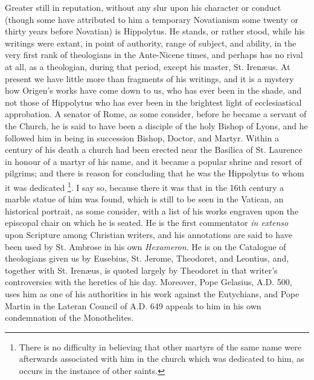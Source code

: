 Greater still in reputation, without any slur upon his character or
conduct (though some have attributed to him a temporary Novatianism
some twenty or thirty years before Novatian) is Hippolytus. He stands,
or rather stood, while his writings were extant, in point of authority, range of subject, and ability, in the very first rank of
theologians in the Ante-Nicene times, and perhaps has no rival at all,
as a theologian, during that period, except his master, St. Irenæus.
At present we have little more than fragments of his writings, and it
is a mystery how Origen's works have come down to us, who has ever
been in the shade, and not those of Hippolytus who has ever been in
the brightest light of ecclesiastical approbation. A senator of Rome,
as some consider, before he became a servant of the Church, he is said
to have been a disciple of the holy Bishop of Lyons, and he followed
him in being in succession Bishop, Doctor, and Martyr. Within a
century of his death a church had been erected near the Basilica of
St. Laurence in honour of a martyr of his name, and it became a
popular shrine and resort of pilgrims; and there is reason for
concluding that he was the Hippolytus to whom it was dedicated \footnote{There is no difficulty in believing that other martyrs of the
same name were afterwards associated with him in the church which was
dedicated to him, as occurs in the instance of other saints.}. I say so, because there it was that in the 16th century a
marble statue of him was found, which is still to be seen in the
Vatican, an historical portrait, as some consider, with a list of his
works engraven upon the episcopal chair on which he is seated. He is
the first commentator \emph{in extenso} upon Scripture among Christian
writers, and his annotations are said to have been used by St. Ambrose
in his own \emph{Hexameron}. He is on the Catalogue of theologians
given us by Eusebius, St. Jerome, Theodoret, and Leontius, and,
together with St. Irenæus, is quoted largely by Theodoret in that
writer's controversies with the heretics of his day. Moreover, Pope
Gelasius, A.D. 500, uses him as one of his
authorities in his work against the Eutychians, and Pope Martin in the
Lateran Council of A.D. 649 appeals to him in
his own condemnation of the Monothelites.


